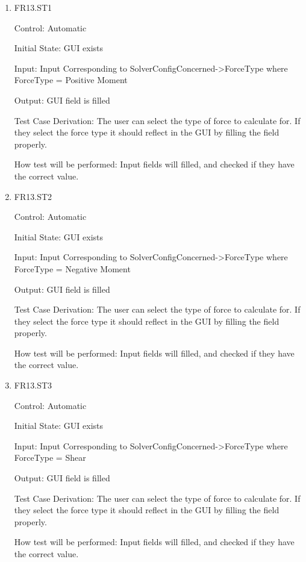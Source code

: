 \documentclass[12pt, titlepage]{article}
\begin{document}
\begin{enumerate}

\item{FR13.ST1\\}

Control: Automatic
					
Initial State: GUI exists
					
Input: Input Corresponding to SolverConfigConcerned->ForceType where ForceType = Positive Moment 
					
Output: GUI field is filled

Test Case Derivation: The user can select the type of force to calculate for. If they select the force type it should reflect in the GUI by filling the field properly.

How test will be performed: Input fields will filled, and checked if they have the correct value.

\item{FR13.ST2\\}

Control: Automatic
					
Initial State: GUI exists
					
Input: Input Corresponding to SolverConfigConcerned->ForceType where ForceType = Negative Moment 
					
Output: GUI field is filled

Test Case Derivation: The user can select the type of force to calculate for. If they select the force type it should reflect in the GUI by filling the field properly.

How test will be performed: Input fields will filled, and checked if they have the correct value.

\item{FR13.ST3\\}

Control: Automatic
					
Initial State: GUI exists
					
Input: Input Corresponding to SolverConfigConcerned->ForceType where ForceType = Shear
					
Output: GUI field is filled

Test Case Derivation: The user can select the type of force to calculate for. If they select the force type it should reflect in the GUI by filling the field properly.

How test will be performed: Input fields will filled, and checked if they have the correct value.
					

\end{enumerate}
\end{document}
